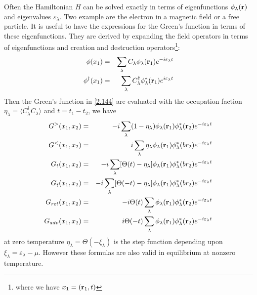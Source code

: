 Often the Hamiltonian $H$ can be solved exactly in terms of eigenfunctions $\phi_\lambda(\mathbf{r})$ and eigenvalues $\varepsilon_\lambda$.
Two example are the electron in a magnetic field or a free particle.
It is useful to have the expressions for the Green's function in terms of these eigenfunctions.
They are derived by expanding the field operators in terms of eigenfunctions and creation and destruction operators\footnote{where we have $x_1 = (\mathbf{r}_1,t)$}:
\begin{eqnarray}
  \phi(x_1) &=& \sum_\lambda C_\lambda \phi_\lambda (\mathbf{r}_1) e^{-i\varepsilon_\lambda t} \nonumber \\
  \phi^\dagger (x_1) &=& \sum_\lambda C^\dagger_\lambda \phi^*_\lambda(\mathbf{r}_1) e^{i\varepsilon_\lambda t} \label{2.146}
\end{eqnarray}
Then the Green's function in \eqref{2.144} are evaluated with the occupation faction $\eta_\lambda=\langle C^\dagger_\lambda C_\lambda \rangle$ and $t= t_1 -t_2$, we have
\begin{eqnarray}
  G^>(x_1,x_2) &=& -i \sum_\lambda (1-\eta_\lambda) \phi_\lambda(\mathbf{r}_1) \phi^*_\lambda(\mathbf{r}_2) e^{-i\varepsilon_\lambda t} \nonumber \\
  G^<(x_1,x_2) &=& i \sum_\lambda \eta_\lambda \phi_\lambda(\mathbf{r}_1) \phi^*_\lambda(br_2) e^{-i\varepsilon_\lambda t} \nonumber \\
  G_t(x_1,x_2) &=& -i \sum_\lambda [\Theta(t)-\eta_\lambda] \phi_\lambda(\mathbf{r}_1) \phi_\lambda^*(br_2) e^{-i\varepsilon_\lambda t} \nonumber \\
  G_{\bar{t}}(x_1,x_2) &=& -i \sum_\lambda [\Theta(-t)-\eta_\lambda] \phi_\lambda(\mathbf{r}_1) \phi_\lambda^*(br_2) e^{-i\varepsilon_\lambda t} \nonumber \\
  G_{ret} (x_1,x_2) &=& -i\Theta(t) \sum_\lambda \phi_\lambda(\mathbf{r}_1) \phi^*_\lambda(\mathbf{r}_2)e^{-i\varepsilon_\lambda t} \nonumber \\
  G_{adv} (x_1,x_2) &=& i\Theta(-t) \sum_\lambda \phi_\lambda(\mathbf{r}_1) \phi_\lambda^*(\mathbf{r}_2) e^{-i\varepsilon_\lambda t} \label{2.147}
\end{eqnarray}
at zero temperature $\eta_\lambda = \Theta(-\xi_\lambda)$ is the step function depending upon $\xi_\lambda = \varepsilon_\lambda - \mu$.
However these formulas are also valid in equilibrium at nonzero temperature.


